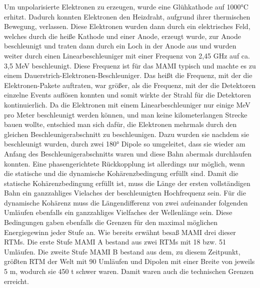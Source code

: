 \documentclass[a4paper,11pt,oneside,final,german,openbib,pdftex]{scrbook}
\begin{document}
Um unpolarisierte Elektronen zu erzeugen, wurde eine Glühkathode auf 1000°C erhitzt. Dadurch konnten Elektronen den Heizdraht, aufgrund ihrer thermischen Bewegung, verlassen. Diese Elektronen wurden dann durch ein elektrisches Feld, welches durch die heiße Kathode und einer Anode, erzeugt wurde, zur Anode beschleunigt und traten dann durch ein Loch in der Anode aus und wurden weiter durch einen Linearbeschleuniger mit einer Frequenz von 2,45 GHz auf ca. 3,5 MeV beschleunigt. Diese Frequenz ist für das MAMI typisch und machte es zu einem Dauerstrich-Elektronen-Beschleuniger. Das heißt die Frequenz, mit der die Elektronen-Pakete auftraten, war größer, als die Frequenz, mit der die Detektoren einzelne Events auflösen konnten und somit wirkte der Strahl für die Detektoren kontinuierlich.
\newline
Da die Elektronen mit einem Linearbeschleuniger nur einige MeV pro Meter beschleunigt werden k\"onnen, und man keine kilometerlangen Strecke bauen wollte, entschied man sich daf\"ur, die Elektronen mehrmals durch den gleichen Beschleunigerabschnitt zu beschleunigen. Dazu wurden sie nachdem sie beschleunigt wurden, durch zwei 180° Dipole so umgeleitet, dass sie wieder am Anfang des Beschleunigerabschnitts waren und diese Bahn abermals durchlaufen konnten. Eine phasengerichtete R\"uckkopplung ist allerdings nur m\"oglich, wenn die statische und die dynamische Koh\"arenzbedingung erf\"ullt sind. Damit die statische Koh\"arenzbedingung erf\"ullt ist, muss die L\"ange der ersten vollst\"andigen Bahn ein ganzzahliges Vielaches der beschleunigten Hochfrequenz sein. F\"ur die dynamische Koh\"arenz muss die L\"angendifferenz von zwei aufeinander folgenden Uml\"aufen ebenfalls ein ganzzahliges Vielfaches der Wellenl\"ange sein\cite{Un08}. Diese Bedingungen gaben ebenfalls die Grenzen f\"ur den maximal m\"oglichen Energiegewinn jeder Stufe an. 
\newline
\newline
Wie bereits erw\"ahnt besa{\ss} MAMI drei dieser RTMs. Die erste Stufe MAMI A bestand aus zwei RTMs mit 18 bzw. 51 Uml\"aufen. Die zweite Stufe MAMI B bestand aus dem, zu diesem Zeitpunkt, gr\"o{\ss}ten RTM der Welt mit 90 Uml\"aufen und Dipolen mit einer Breite von jeweils 5 m, wodurch sie 450 t schwer waren. Damit waren auch die technischen Grenzen erreicht.\cite{KPh11F}
\end{document}
